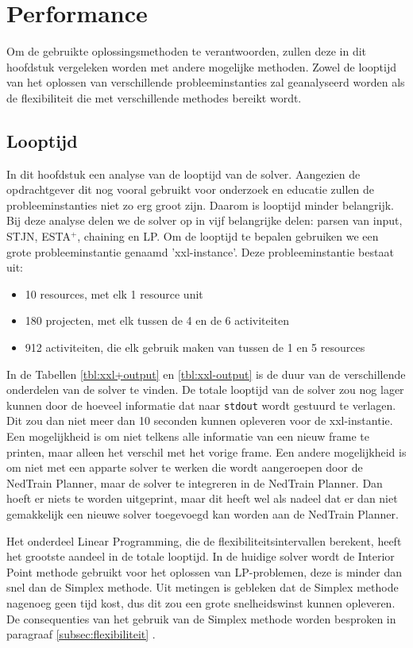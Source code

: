 \section{Performance}
Om de gebruikte oplossingsmethoden te verantwoorden, zullen deze in dit hoofdstuk vergeleken worden met andere mogelijke methoden. Zowel de looptijd van het oplossen van verschillende probleeminstanties zal geanalyseerd worden als de flexibiliteit die met verschillende methodes bereikt wordt.

\subsection{Looptijd}
In dit hoofdstuk een analyse van de looptijd van de solver. Aangezien de opdrachtgever dit nog vooral gebruikt voor onderzoek en educatie zullen de probleeminstanties niet zo erg groot zijn. Daarom is looptijd minder belangrijk. Bij deze analyse delen we de solver op in vijf belangrijke delen: parsen van input, STJN, ESTA$^+$, chaining en LP. Om de looptijd te bepalen gebruiken we een grote probleeminstantie genaamd 'xxl-instance'. Deze probleeminstantie bestaat uit:
\begin{itemize}
    \item 10 resources, met elk 1 resource unit
    \item 180 projecten, met elk tussen de 4 en de 6 activiteiten
    \item 912 activiteiten, die elk gebruik maken van tussen de 1 en 5 resources
\end{itemize}

In de Tabellen \ref{tbl:xxl+output} en \ref{tbl:xxl-output} is de duur van de verschillende onderdelen van de solver te vinden. De totale looptijd van de solver zou nog lager kunnen door de hoeveel informatie dat naar \texttt{stdout} wordt gestuurd te verlagen. Dit zou dan niet meer dan 10 seconden kunnen opleveren voor de xxl-instantie. Een mogelijkheid is om niet telkens alle informatie van een nieuw frame te printen, maar alleen het verschil met het vorige frame. Een andere mogelijkheid is om niet met een apparte solver te werken die wordt aangeroepen door de NedTrain Planner, maar de solver te integreren in de NedTrain Planner. Dan hoeft er niets te worden uitgeprint, maar dit heeft wel als nadeel dat er dan niet gemakkelijk een nieuwe solver toegevoegd kan worden aan de NedTrain Planner.

Het onderdeel Linear Programming, die de flexibiliteitsintervallen berekent, heeft het grootste aandeel in de totale looptijd. In de huidige solver wordt de Interior Point methode gebruikt voor het oplossen van LP-problemen, deze is minder dan snel dan de Simplex methode. Uit metingen is gebleken dat de Simplex methode nagenoeg geen tijd kost, dus dit zou een grote snelheidswinst kunnen opleveren. De consequenties van het gebruik van de Simplex methode worden besproken in paragraaf \ref{subsec:flexibiliteit} .

